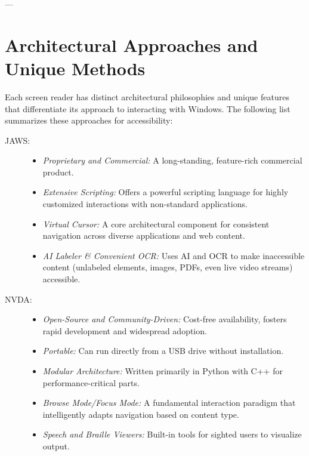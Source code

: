 ---

\section{Architectural Approaches and Unique Methods}
\label{sec:architectural-approaches}

Each screen reader has distinct architectural philosophies and unique features that differentiate its approach to interacting with Windows. The following list summarizes these approaches for accessibility:

\begin{description}
    \item[JAWS:]
    \begin{itemize}
        \item \emph{Proprietary and Commercial:} A long-standing, feature-rich commercial product.
        \item \emph{Extensive Scripting:} Offers a powerful scripting language for highly customized interactions with non-standard applications. \cite{JAWSScripting}
        \item \emph{Virtual Cursor:} A core architectural component for consistent navigation across diverse applications and web content. \cite{JAWSKeyboardGestures}
        \item \emph{AI Labeler \& Convenient OCR:} Uses AI and OCR to make inaccessible content (unlabeled elements, images, PDFs, even live video streams) accessible. \cite{JAWSAILabeler, JAWSOCR}
    \end{itemize}
    \item[NVDA:]
    \begin{itemize}
        \item \emph{Open-Source and Community-Driven:} Cost-free availability, fosters rapid development and widespread adoption. \cite{NVAccess}
        \item \emph{Portable:} Can run directly from a USB drive without installation. \cite{NVAccess}
        \item \emph{Modular Architecture:} Written primarily in Python with C++ for performance-critical parts. \cite{AssistivLabsNVDAArch}
        \item \emph{Browse Mode/Focus Mode:} A fundamental interaction paradigm that intelligently adapts navigation based on content type. \cite{NVDAKeyboardCommands}
        \item \emph{Speech and Braille Viewers:} Built-in tools for sighted users to visualize output. \cite{NVDASpeech, NVDABraille}

\end{itemize}
\end{description}
